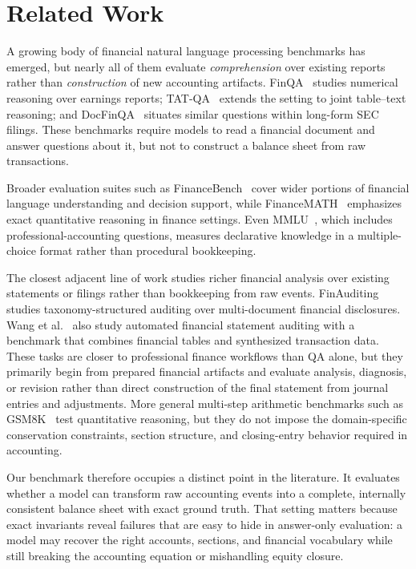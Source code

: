 \section{Related Work}

A growing body of financial natural language processing benchmarks has
emerged, but nearly all of them evaluate \emph{comprehension} over
existing reports rather than \emph{construction} of new accounting
artifacts.
FinQA~\citep{chen2021finqa} studies numerical reasoning over
earnings reports;
TAT-QA~\citep{zhu2021tatqa} extends the setting to joint table--text
reasoning; and
DocFinQA~\citep{reddy2024docfinqa} situates similar questions within
long-form SEC filings.
These benchmarks require models to read a financial document and answer
questions about it, but not to construct a balance sheet from raw
transactions.

Broader evaluation suites such as
FinanceBench~\citep{islam2023financebench} cover wider portions of
financial language understanding and decision support, while
FinanceMATH~\citep{zhao2024financemath} emphasizes exact quantitative
reasoning in finance settings.
Even MMLU~\citep{hendrycks2021mmlu}, which includes
professional-accounting questions, measures declarative knowledge in a
multiple-choice format rather than procedural bookkeeping.

The closest adjacent line of work studies richer financial analysis
over existing statements or filings rather than bookkeeping from raw
events.
FinAuditing
~\citep{wang2025finauditing} studies taxonomy-structured auditing over
multi-document financial disclosures.
Wang et al.~\citep{wang2025automating} also study automated financial
statement auditing with a benchmark that combines financial tables and
synthesized transaction data.
These tasks are closer to professional finance workflows than QA alone,
but they primarily begin from prepared financial artifacts and evaluate
analysis, diagnosis, or revision rather than direct construction of the
final statement from journal entries and adjustments.
More general multi-step arithmetic benchmarks such as
GSM8K~\citep{cobbe2021gsm8k} test quantitative reasoning, but they do
not impose the domain-specific conservation constraints, section
structure, and closing-entry behavior required in accounting.

Our benchmark therefore occupies a distinct point in the literature.
It evaluates whether a model can transform raw accounting events into a
complete, internally consistent balance sheet with exact ground truth.
That setting matters because exact invariants reveal failures that are
easy to hide in answer-only evaluation: a model may recover the right
accounts, sections, and financial vocabulary while still breaking the
accounting equation or mishandling equity closure.
